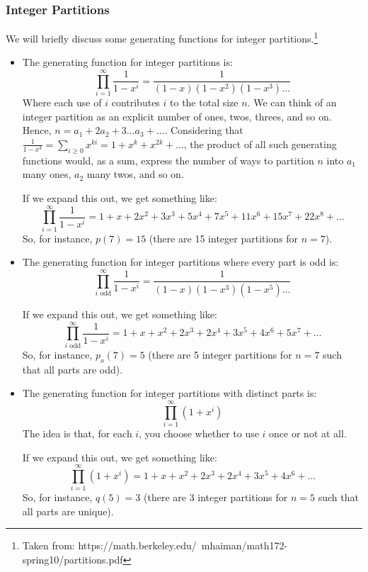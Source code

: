 \documentclass[letterpaper]{article}
\begin{document}
\subsubsection{Integer Partitions}
We will briefly discuss some generating functions for integer partitions.\footnote{Taken from: https://math.berkeley.edu/~mhaiman/math172-spring10/partitions.pdf}
\begin{itemize}
    \item The generating function for integer partitions is:
    \[\prod_{i = 1}^{\infty} \frac{1}{1 - x^i} = \frac{1}{(1 - x)(1 - x^2)(1 - x^3) \dots}\]
    Where each use of $i$ contributes $i$ to the total size $n$. We can think of an integer partition as an explicit number of ones, twos, threes, and so on. Hence, $n = a_1 + 2a_2 + 3 \dots a_3 + \dots$. Considering that $\frac{1}{1 - x^k} = \sum_{i \geq 0} x^{ki} = 1 + x^k + x^{2k} + \dots$, the product of all such generating functions would, as a sum, express the number of ways to partition $n$ into $a_1$ many ones, $a_2$ many twos, and so on.  

    \bigskip 

    If we expand this out, we get something like:
    \[\prod_{i = 1}^{\infty} \frac{1}{1 - x^i} = 1 + x + 2x^2 + 3x^3 + 5x^4 + 7x^5 + 11x^6 + 15x^7 + 22x^8 + \dots\]
    So, for instance, $p(7) = 15$ (there are 15 integer partitions for $n = 7$). 

    \item The generating function for integer partitions where every part is odd is:
    \[\prod_{i \text{ odd}}^{\infty} \frac{1}{1 - x^i} = \frac{1}{(1 - x)(1 - x^3)(1 - x^5) \dots}\]

    \bigskip 

    If we expand this out, we get something like:
    \[\prod_{i \text{ odd}}^{\infty} \frac{1}{1 - x^i} = 1 + x + x^2 + 2x^3 + 2x^4 + 3x^5 + 4x^6 + 5x^7 + \dots\]
    So, for instance, $p_{o}(7) = 5$ (there are 5 integer partitions for $n = 7$ such that all parts are odd). 

    \item The generating function for integer partitions with distinct parts is:
    \[\prod_{i = 1}^{\infty} (1 + x^i)\]
    The idea is that, for each $i$, you choose whether to use $i$ once or not at all. 

    \bigskip 

    If we expand this out, we get something like:
    \[\prod_{i = 1}^{\infty} (1 + x^i) = 1 + x + x^2 + 2x^3 + 2x^4 + 3x^5 + 4x^6 + \dots\]
    So, for instance, $q(5) = 3$ (there are 3 integer partitions for $n = 5$ such that all parts are unique).  
\end{itemize}
\end{document}
